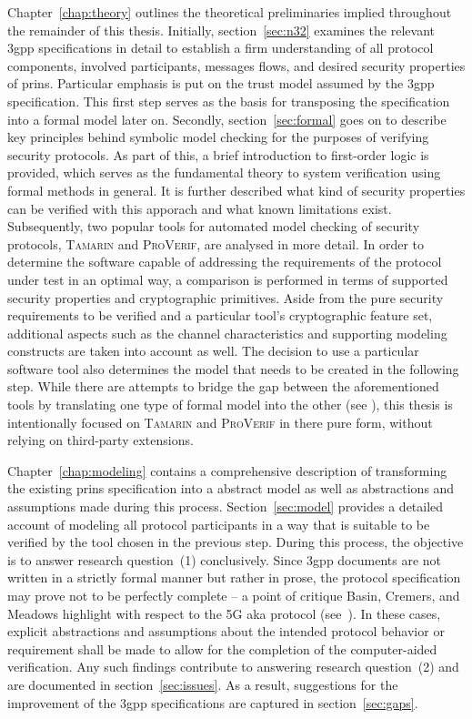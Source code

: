 Chapter~\ref{chap:theory} outlines the theoretical preliminaries implied throughout the remainder of this thesis.
Initially, section~\ref{sec:n32} examines the relevant \gls{3gpp} specifications in detail to establish a firm understanding of all protocol components, involved participants, messages flows, and desired security properties of \gls{prins}.
Particular emphasis is put on the trust model assumed by the \gls{3gpp} specification.
This first step serves as the basis for transposing the specification into a formal model later on.
Secondly, section~\ref{sec:formal} goes on to describe key principles behind symbolic model checking for the purposes of verifying security protocols.
As part of this, a brief introduction to first-order logic is provided, which serves as the fundamental theory to system verification using formal methods in general.
It is further described what kind of security properties can be verified with this apporach and what known limitations exist.
Subsequently, two popular tools for automated model checking of security protocols, \textsc{Tamarin} and \textsc{ProVerif}, are analysed in more detail.
In order to determine the software capable of addressing the requirements of the protocol under test in an optimal way, a comparison is performed in terms of supported security properties and cryptographic primitives.
Aside from the pure security requirements to be verified and a particular tool's cryptographic feature set, additional aspects such as the channel characteristics and supporting modeling constructs are taken into account as well.
The decision to use a particular software tool also determines the model that needs to be created in the following step.
While there are attempts to bridge the gap between the aforementioned tools by translating one type of formal model into the other (see \cite{kremer2016automated}), this thesis is intentionally focused on \textsc{Tamarin} and \textsc{ProVerif} in there pure form, without relying on third-party extensions.

Chapter~\ref{chap:modeling} contains a comprehensive description of transforming the existing \gls{prins} specification into a abstract model as well as abstractions and assumptions made during this process.
Section~\ref{sec:model} provides a detailed account of modeling all protocol participants in a way that is suitable to be verified by the tool chosen in the previous step.
During this process, the objective is to answer research question~(1) conclusively.
Since \gls{3gpp} documents are not written in a strictly formal manner but rather in prose, the protocol specification may prove not to be perfectly complete -- a point of critique Basin, Cremers, and Meadows highlight with respect to the 5G \gls{aka} protocol (see~\cite{basin2018model}).
In these cases, explicit abstractions and assumptions about the intended protocol behavior or requirement shall be made to allow for the completion of the computer-aided verification.
Any such findings contribute to answering research question~(2) and are documented in section~\ref{sec:issues}.
As a result, suggestions for the improvement of the \gls{3gpp} specifications are captured in section~\ref{sec:gaps}.

